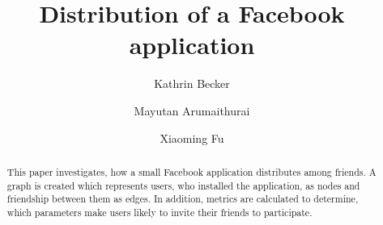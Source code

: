 \documentclass[preprint,12pt]{elsarticle}
\begin{document}
\begin{frontmatter}



\title{Distribution of a Facebook application}



\author[focal]{Kathrin Becker} 
\author[focal]{Mayutan Arumaithurai} %
\author[focal]{Xiaoming Fu} %

\address[focal]{Institute of Computer Science, Computer Networks (NET)
  Research Group, University of G\"ottingen}








\begin{abstract}
This paper investigates, how a small Facebook application 
distributes among friends. A graph is created which represents users, who
installed the application, as nodes and friendship between them as
edges. In addition, metrics are calculated to determine, which
parameters  make users likely to invite their friends to
participate. 


\end{abstract}
\end{frontmatter}
\end{document}

